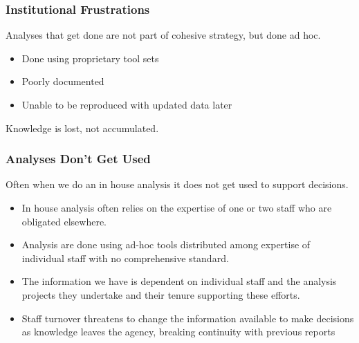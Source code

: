\documentclass{beamer}
\begin{document}
\begin{frame}
\frametitle{Institutional Frustrations}
Analyses that get done are not part of cohesive strategy, but done ad hoc.
  \begin{itemize}
  \item Done using proprietary tool sets
  \item Poorly documented
  \item Unable to be reproduced with updated data later
  \end {itemize}
Knowledge is lost, not accumulated.
\end{frame}

{
\begin{frame}[plain]
\end{frame}
}


\begin{frame}
\frametitle{Analyses Don't Get Used}
Often when we do an in house analysis it does not get used to support decisions.
  \begin{itemize}
  \item In house analysis often relies on the expertise of one or two staff who are obligated elsewhere. 
  \pause
  \item Analysis are done using ad-hoc tools distributed among expertise of individual staff with no comprehensive standard. 
  \pause
  \item The information we have is dependent on individual staff and the analysis projects they undertake and their tenure supporting these efforts.
  \pause
  \item Staff turnover threatens to change the information available to make decisions as knowledge leaves the agency, breaking continuity with previous reports
  \end{itemize}
\end{frame}
\end{document}
